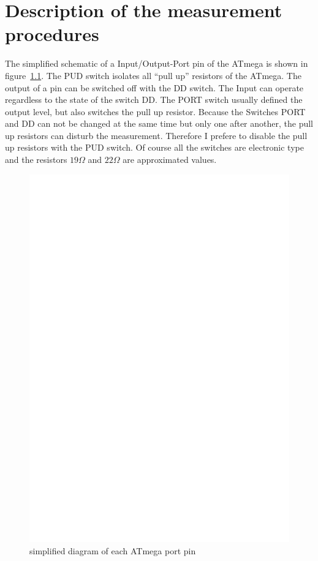 \chapter{Description of the measurement procedures}
The simplified schematic of a Input/Output-Port pin of the ATmega is shown in figure~\ref{fig:port}.
The PUD switch isolates all ``pull up'' resistors of the ATmega. The output of a pin can be switched off
with the DD switch. The Input can operate regardless to the state of the switch DD.
The PORT switch usually defined the output level, but also switches the pull up resistor.
Because the Switches PORT and DD can not be changed at the same time but only one after another, the
pull up resistors can disturb the measurement. Therefore I prefere to disable the pull up resistors with the
PUD switch.
Of course all the switches are electronic type and the resistors \(19\Omega\) and \(22\Omega\) are approximated values.

\begin{figure}[H]
\centering
\includegraphics[]{../FIG/port.eps}
\caption{simplified diagram of each ATmega port pin}
\label{fig:port}
\end{figure}

